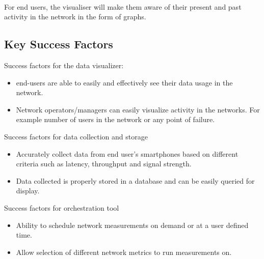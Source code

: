 \paragraph{}
For end users, the visualiser will make them aware of their present and past activity in the network in the form of graphs.
\subsection{Key Success Factors}
Success factors for the data visualizer:
\begin{itemize}
	\item end-users are able to easily and effectively see their data usage in the network.
	\item Network operators/managers can easily visualize activity in the networks. For example number of users in the network or any point of failure. 
\end{itemize}
Success factors for data collection and storage
\begin{itemize}
	\item Accurately collect data from end user's smartphones based on different criteria such as latency, throughput and signal strength.
	\item Data collected is properly stored in a database and can be easily queried for display.
\end{itemize}
Success factors for orchestration tool
\begin{itemize}
	\item Ability to schedule network measurements on demand or at a user defined time.
	\item Allow selection of different network metrics to run measurements on. 
\end{itemize} 


